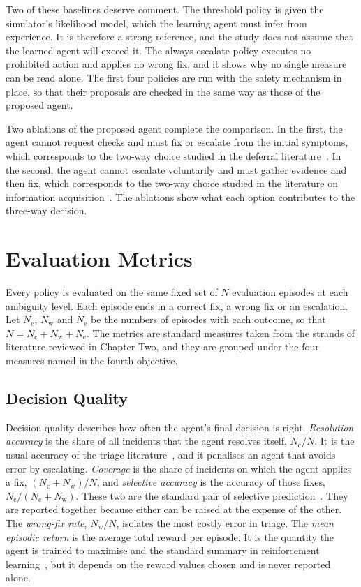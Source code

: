 Two of these baselines deserve comment. The threshold policy is given the simulator's likelihood model, which the learning agent must infer from experience. It is therefore a strong reference, and the study does not assume that the learned agent will exceed it. The always-escalate policy executes no prohibited action and applies no wrong fix, and it shows why no single measure can be read alone. The first four policies are run with the safety mechanism in place, so that their proposals are checked in the same way as those of the proposed agent.

Two ablations of the proposed agent complete the comparison. In the first, the agent cannot request checks and must fix or escalate from the initial symptoms, which corresponds to the two-way choice studied in the deferral literature~\cite{madras2018}. In the second, the agent cannot escalate voluntarily and must gather evidence and then fix, which corresponds to the two-way choice studied in the literature on information acquisition~\cite{janisch2019}. The ablations show what each option contributes to the three-way decision.

\section{Evaluation Metrics}
\label{sec:metrics}

Every policy is evaluated on the same fixed set of $N$ evaluation episodes at each ambiguity level. Each episode ends in a correct fix, a wrong fix or an escalation. Let $N_{\text{c}}$, $N_{\text{w}}$ and $N_{\text{e}}$ be the numbers of episodes with each outcome, so that $N = N_{\text{c}} + N_{\text{w}} + N_{\text{e}}$. The metrics are standard measures taken from the strands of literature reviewed in Chapter Two, and they are grouped under the four measures named in the fourth objective.

\subsection{Decision Quality}

Decision quality describes how often the agent's final decision is right. \emph{Resolution accuracy} is the share of all incidents that the agent resolves itself, $N_{\text{c}} / N$. It is the usual accuracy of the triage literature~\cite{remil2024}, and it penalises an agent that avoids error by escalating. \emph{Coverage} is the share of incidents on which the agent applies a fix, $(N_{\text{c}} + N_{\text{w}}) / N$, and \emph{selective accuracy} is the accuracy of those fixes, $N_{\text{c}} / (N_{\text{c}} + N_{\text{w}})$. These two are the standard pair of selective prediction~\cite{geifman2019}. They are reported together because either can be raised at the expense of the other. The \emph{wrong-fix rate}, $N_{\text{w}} / N$, isolates the most costly error in triage. The \emph{mean episodic return} is the average total reward per episode. It is the quantity the agent is trained to maximise and the standard summary in reinforcement learning~\cite{sutton2018}, but it depends on the reward values chosen and is never reported alone.


